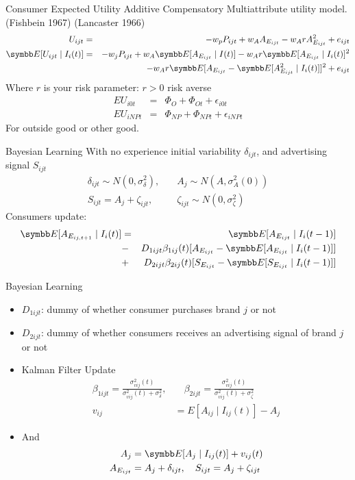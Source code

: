\documentclass[aspectratio=169,11pt]{beamer}
\begin{document}
\begin{frame}{Consumer Expected Utility}
Additive Compensatory Multiattribute utility model. (Fishbein 1967) (Lancaster 1966)
\begin{eqnarray*}
U_{ijt} &=& -w_p P_{ijt} + w_A A_{E_{ijt}} - w_A r A_{E_{ijt}}^2 + e_{ijt}\\
\E[U_{ijt} \mid I_i(t)] &=& -w_j P_{ijt} + w_A \E[A_{E_{ijt}} \mid I(t)] - w_A r \E [A_{E_{ijt}} \mid I_i(t)]^2\\
&&-w_A r \E[A_{E_{ijt}} - \E[A_{E_{ijt}}^2 \mid I_i(t)]]^2 + e_{ijt}
\end{eqnarray*}
Where $r$ is your risk parameter:  $r > 0$ risk averse
\begin{eqnarray*}
EU_{i0t}  &=& \Phi_{O} + \Phi_{Ot} + \epsilon_{i0t}\\
EU_{iNPt}  &=& \Phi_{NP} + \Phi_{NPt} + \epsilon_{iNPt}
\end{eqnarray*}
For outside good or other good.
\end{frame}

\begin{frame}{Bayesian Learning}
With no experience initial variability $\delta_{ijt}$, and advertising signal $S_{ijt}$
\begin{eqnarray*}
\delta_{ijt} \sim N(0,\sigma_{\delta}^2),  \quad& A_j \sim N(A,\sigma_A^2(0))\\
S_{ijt} = A_j + \zeta_{ijt}, \quad &\zeta_{ijt} \sim N(0,\sigma_{\zeta}^2)
\end{eqnarray*}
Consumers update:
\begin{eqnarray*}
\E[A_{E_{ij,t+1}} \mid I_i(t)] &=&  \E[A_{E_{ijt}} \mid I_i(t-1)] \\
 &-& D_{1ijt} \beta_{1ij}(t) [A_{E_{ijt}} - \E[A_{E_{ijt}} \mid I_i(t-1)] ] \\
 &+&D_{2ijt} \beta_{2ij}(t) [S_{E_{ijt}} - \E[S_{E_{ijt}} \mid I_i(t-1)] ] \\
\end{eqnarray*}
\end{frame}

\begin{frame}{Bayesian Learning}
\begin{itemize}
\item $D_{1ijt}$: dummy of whether consumer purchases brand $j$ or not
\item $D_{2ijt}$: dummy of whether consumers receives an advertising signal of brand $j$ or not
\item Kalman Filter Update
\begin{align*}
\beta_{1ijt} = \frac{ \sigma_{vij}^2(t)} { \sigma_{vij}^2(t) + \sigma_{\delta}^2}, &\quad 
\beta_{2ijt} = \frac{ \sigma_{vij}^2(t)} { \sigma_{vij}^2(t) + \sigma_{\zeta}^2}\\
v_{ij} &= E[A_{ij} \mid I_{ij}(t)] - A_j
\end{align*} 
\item And
\begin{align*}
A_{j} &= \E[A_j \mid I_{ij}(t)] + v_{ij}(t)\\
A_{E_{ijt}} &= A_j + \delta_{ijt} , \quad S_{ijt} = A_j + \zeta_{ijt}
\end{align*} 
\end{itemize}
\end{frame}
\end{document}
